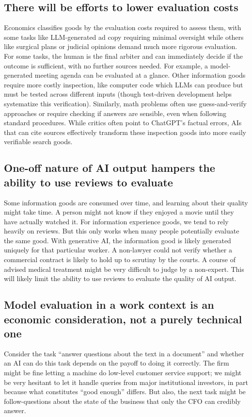 \documentclass{article}
\theoremstyle{plain}
\theoremstyle{plain}
\begin{document}
\subsection{There will be efforts to lower evaluation costs}
Economics classifies goods by the evaluation costs required to assess them, with some tasks like LLM-generated ad copy requiring minimal oversight while others like surgical plans or judicial opinions demand much more rigorous evaluation.
For some tasks, the human is the final arbiter and can immediately decide if the outcome is sufficient, with no further sources needed. 
For example, a model-generated meeting agenda can be evaluated at a glance. 
Other information goods require more costly inspection, like computer code which LLMs can produce but must be tested across different inputs (though test-driven development helps systematize this verification). 
Similarly, math problems often use guess-and-verify approaches or require checking if answers are sensible, even when following standard procedures. 
While critics often point to ChatGPT's factual errors, AIs that can cite sources effectively transform these inspection goods into more easily verifiable search goods.
  
\subsection{One-off nature of AI output hampers the ability to use reviews to evaluate}
Some information goods are consumed over time, and learning about their quality might take time. 
A person might not know if they enjoyed a movie until they have actually watched it. 
For information experience goods, we tend to rely heavily on reviews. 
But this only works when many people potentially evaluate the same good. 
With generative AI, the information good is likely generated uniquely for that particular worker. 
A non-lawyer could not verify whether a commercial contract is likely to hold up to scrutiny by the courts. 
A course of advised medical treatment might be very difficult to judge by a non-expert.
This will likely limit the ability to use reviews to evaluate the quality of AI output.

\subsection{Model evaluation in a work context is an economic consideration, not a purely technical one}
Consider the task ``answer questions about the text in a document'' and whether an AI can do this task depends on the payoff to doing it correctly. 
The firm might be fine letting a machine do low-level customer service support; we might be very hesitant to let it handle queries from major institutional investors, in part because what constitutes ``good enough'' differs.
But also, the next task might be follow-questions about the state of the business that only the CFO can credibly answer.
  
\end{document}
